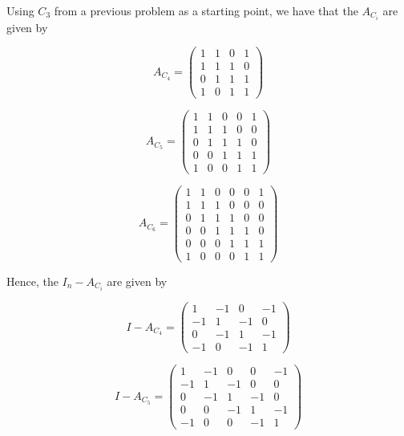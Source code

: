 \begin{solution}\renewcommand{\qedsymbol}{}\ \\
    Using $C_3$ from a previous problem as a starting point, we have that the $A_{C_i}$ are given by

    $$A_{C_4}=\left(\begin{array}{cccc} 1 & 1 & 0 & 1 \\ 1 & 1 & 1 & 0 \\ 
                                        0 & 1 & 1 & 1 \\ 1 & 0 & 1 & 1 \end{array}\right)$$

    $$A_{C_5}=\left(\begin{array}{ccccc} 1 & 1 & 0 & 0 & 1 \\ 1 & 1 & 1 & 0 & 0 \\ 
         0 & 1 & 1 & 1 & 0 \\ 0 & 0 & 1 & 1 & 1 \\ 1 & 0 & 0 & 1 & 1 \end{array}\right)$$

    $$A_{C_6}=\left(\begin{array}{cccccc} 1 & 1 & 0 & 0 & 0 & 1 \\ 1 & 1 & 1 & 0 & 0 & 0 \\
                                          0 & 1 & 1 & 1 & 0 & 0 \\ 0 & 0 & 1 & 1 & 1 & 0 \\
                        0 & 0 & 0 & 1 & 1 & 1 \\ 1 & 0 & 0 & 0 & 1 & 1 \end{array}\right)$$

    Hence, the $I_n-A_{C_i}$ are given by

    $$I-A_{C_4}=\left(\begin{array}{cccc} 1 & -1 & 0 & -1 \\ -1 & 1 & -1 & 0 \\ 
                                        0 & -1 & 1 & -1 \\ -1 & 0 & -1 & 1 \end{array}\right)$$

    $$I-A_{C_5}=\left(\begin{array}{ccccc} 1 & -1 & 0 & 0 & -1 \\ -1 & 1 & -1 & 0 & 0 \\
         0 & -1 & 1 & -1 & 0 \\ 0 & 0 & -1 & 1 & -1 \\ -1 & 0 & 0 & -1 & 1 \end{array}\right)$$


\end{solution}
